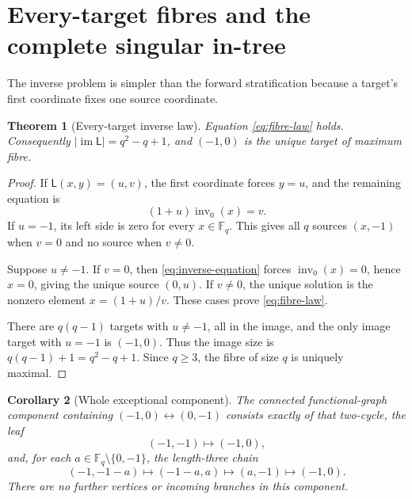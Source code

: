 \documentclass[10pt,a4paper]{amsart}
\newtheorem{theorem}{Theorem}[section]
\newtheorem{corollary}[theorem]{Corollary}
\theoremstyle{definition}
\theoremstyle{remark}
\newcommand{\F}{\mathbb F}
\newcommand{\Lyn}{\mathsf L}
\newcommand{\im}{\operatorname{im}}
\newcommand{\invz}{\operatorname{inv}_0}
\begin{document}
\section{Every-target fibres and the complete singular in-tree}

The inverse problem is simpler than the forward stratification because a
target's first coordinate fixes one source coordinate.

\begin{theorem}[Every-target inverse law]\label{thm:fibres}
Equation \eqref{eq:fibre-law} holds.  Consequently
$|\im\Lyn|=q^2-q+1$, and $(-1,0)$ is the unique target of maximum fibre.
\end{theorem}

\begin{proof}
If $\Lyn(x,y)=(u,v)$, the first coordinate forces $y=u$, and the remaining
equation is
\begin{equation}\label{eq:inverse-equation}
 (1+u)\invz(x)=v.
\end{equation}
If $u=-1$, its left side is zero for every $x\in\F_q$.  This gives all $q$
sources $(x,-1)$ when $v=0$ and no source when $v\ne0$.

Suppose $u\ne-1$.  If $v=0$, then \eqref{eq:inverse-equation} forces
$\invz(x)=0$, hence $x=0$, giving the unique source $(0,u)$.  If $v\ne0$,
the unique solution is the nonzero element $x=(1+u)/v$.  These cases prove
\eqref{eq:fibre-law}.

There are $q(q-1)$ targets with $u\ne-1$, all in the image, and the only
image target with $u=-1$ is $(-1,0)$.  Thus the image size is
$q(q-1)+1=q^2-q+1$.  Since $q\geq3$, the fibre of size $q$ is uniquely
maximal.
\end{proof}

\begin{corollary}[Whole exceptional component]\label{cor:tree}
The connected functional-graph component containing
$(-1,0)\leftrightarrow(0,-1)$ consists exactly of that two-cycle, the leaf
\begin{equation}\label{eq:single-leaf}
 (-1,-1)\longmapsto(-1,0),
\end{equation}
and, for each $a\in\F_q\setminus\{0,-1\}$, the length-three chain
\begin{equation}\label{eq:all-chains}
 (-1,-1-a)\longmapsto(-1-a,a)\longmapsto(a,-1)
 \longmapsto(-1,0).
\end{equation}
There are no further vertices or incoming branches in this component.
\end{corollary}
\end{document}
